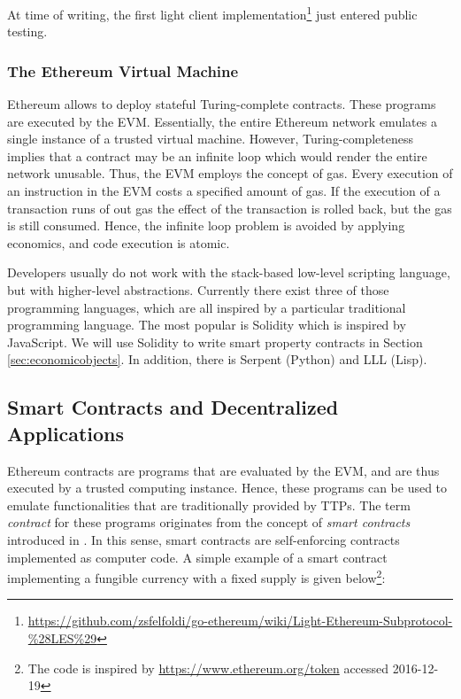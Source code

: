 At time of writing, the first light client implementation\footnote{\url{https://github.com/zsfelfoldi/go-ethereum/wiki/Light-Ethereum-Subprotocol-\%28LES\%29}} just entered public testing.

\subsubsection{The Ethereum Virtual Machine}

Ethereum allows to deploy stateful Turing-complete contracts. These programs are executed by the \ac{EVM}. Essentially, the entire Ethereum network emulates a single instance of a trusted virtual machine. 
However, Turing-completeness implies that a contract may be an infinite loop which would render the entire network unusable. Thus, the \ac{EVM} employs the concept of gas. Every execution of an instruction in the \ac{EVM} costs a specified amount of gas. If the execution of a transaction runs of out gas the effect of the transaction is rolled back, but the gas is still consumed. Hence, the infinite loop problem is avoided by applying economics, and code execution is atomic.

Developers usually do not work with the stack-based low-level scripting language, but with higher-level abstractions. Currently there exist three of those programming languages, which are all inspired by a particular traditional programming language. The most popular is Solidity which is inspired by JavaScript. We will use Solidity to write smart property contracts in Section \ref{sec:economicobjects}. In addition, there is Serpent (Python) and LLL (Lisp).


\subsection{Smart Contracts and Decentralized Applications}
\label{sec:smartcontracts}

Ethereum contracts are programs that are evaluated by the \ac{EVM}, and are thus executed by a trusted computing instance. Hence, these programs can be used to emulate functionalities that are traditionally provided by \ac{TTP}s. The term \emph{contract} for these programs originates from the concept of \emph{smart contracts} introduced in \parencite{szabo1997}. In this sense, smart contracts are self-enforcing contracts implemented as computer code. A simple example of a smart contract implementing a fungible currency with a fixed supply is given below\footnote{The code is inspired by \url{https://www.ethereum.org/token} accessed 2016-12-19}:

